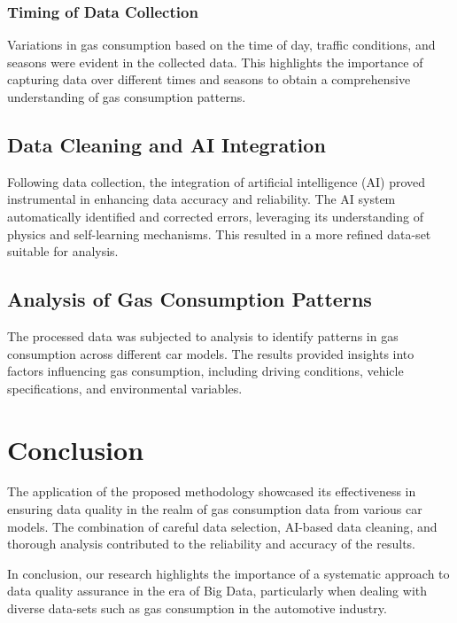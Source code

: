 \documentclass[10pt,a4paper]{article}
\begin{document}
\subsubsection{Timing of Data Collection}

Variations in gas consumption based on the time of day, traffic conditions, and seasons were evident in the collected data. This highlights the importance of capturing data over different times and seasons to obtain a comprehensive understanding of gas consumption patterns.

\subsection{Data Cleaning and AI Integration}

Following data collection, the integration of artificial intelligence (AI) proved instrumental in enhancing data accuracy and reliability. The AI system automatically identified and corrected errors, leveraging its understanding of physics and self-learning mechanisms. This resulted in a more refined data-set suitable for analysis.

\subsection{Analysis of Gas Consumption Patterns}

The processed data was subjected to analysis to identify patterns in gas consumption across different car models. The results provided insights into factors influencing gas consumption, including driving conditions, vehicle specifications, and environmental variables.

\section{Conclusion}

The application of the proposed methodology showcased its effectiveness in ensuring data quality in the realm of gas consumption data from various car models. The combination of careful data selection, AI-based data cleaning, and thorough analysis contributed to the reliability and accuracy of the results.

In conclusion, our research highlights the importance of a systematic approach to data quality assurance in the era of Big Data, particularly when dealing with diverse data-sets such as gas consumption in the automotive industry.



\end{document}
